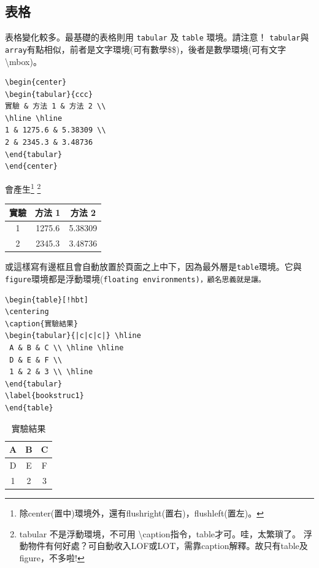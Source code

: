 \subsection{表格}
表格變化較多。最基礎的表格則用 {\tt tabular} 及 {\tt table} 環境。請注意！
{\tt tabular}與{\tt array}有點相似，前者是文字環境(可有數學\$\$)，後者是數學環境(可有文字\textbackslash mbox)。
\begin{Verbatim}[frame=single,firstline=1,label=Tabular 1]
\begin{center}
\begin{tabular}{ccc}
實驗 & 方法 1 & 方法 2 \\  
\hline \hline
1 & 1275.6 & 5.38309 \\ 
2 & 2345.3 & 3.48736
\end{tabular}
\end{center}
\end{Verbatim}
會產生\footnote{除center(置中)環境外，還有flushright(置右)，flushleft(置左)。}  \footnote{tabular 不是浮動環境，不可用{ \textbackslash caption}指令，table才可。哇，太繁瑣了。
浮動物件有何好處？可自動收入LOF或LOT，需靠caption解釋。故只有table及figure，不多啦!}
\begin{center}
\begin{tabular}{ccc}
實驗 & 方法 1 & 方法 2 \\  \hline \hline 
1 & 1275.6 & 5.38309  \\ 
2 & 2345.3 & 3.48736
\end{tabular}
\end{center}  
%
或這樣寫有邊框且會自動放置於頁面之上中下，因為最外層是{\tt table}環境。它與{\tt figure}環境都是浮動環境(\tt floating environments)，顧名思義就是讓。
\begin{Verbatim}[frame=single,firstline=1,label=Tabular 2]
\begin{table}[!hbt]
\centering
\caption{實驗結果} 
\begin{tabular}{|c|c|c|} \hline 
 A & B & C \\ \hline \hline
 D & E & F \\
 1 & 2 & 3 \\ \hline
\end{tabular}
\label{bookstruc1}
\end{table}
\end{Verbatim}
\begin{table}[!hbt]
\centering  
\caption{實驗結果} 
\begin{tabular}{|c|c|c|} \hline        
A & B & C \\ \hline \hline
D & E & F \\
1 & 2 & 3 \\ \hline 
\end{tabular}
\end{table} 
